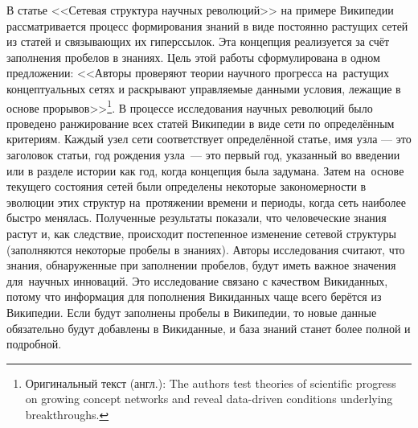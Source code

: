 В статье <<Сетевая структура научных революций>>\autocite{Network_structure_revolutions} 
на примере Википедии рассматривается процесс формирования знаний 
в виде постоянно растущих сетей из статей и связывающих их гиперссылок. 
Эта концепция реализуется за счёт заполнения пробелов в знаниях. 
Цель этой работы сформулирована в одном предложении: 
<<Авторы проверяют теории научного прогресса на~растущих концептуальных сетях 
и раскрывают управляемые данными условия, лежащие в основе прорывов>>\footnote{%
%
Оригинальный текст (англ.):  The authors test theories of scientific progress 
    on growing concept networks and reveal data-driven conditions 
    underlying breakthroughs.}. 
В процессе исследования научных революций было проведено ранжирование всех статей Википедии 
в виде сети по определённым критериям. 
Каждый узел сети соответствует определённой статье, имя узла --- это заголовок статьи, 
год рождения узла~--- это первый год, указанный во введении или в разделе истории как год, когда концепция была задумана. 
Затем на~основе текущего состояния сетей были определены некоторые закономерности 
в эволюции этих структур на~протяжении времени и периоды, 
когда сеть наиболее быстро менялась. 
Полученные результаты показали, что человеческие знания растут и, как следствие, 
происходит постепенное изменение сетевой структуры (заполняются некоторые пробелы в знаниях). 
Авторы исследования считают, что знания, 
обнаруженные при заполнении пробелов, будут иметь важное значения для~научных инноваций. 
Это исследование связано с качеством Викиданных, 
потому что информация для пополнения Викиданных чаще всего берётся из Википедии. 
Если будут заполнены пробелы в Википедии, то новые данные обязательно будут добавлены в Викиданные, 
и база знаний станет более полной и подробной.
